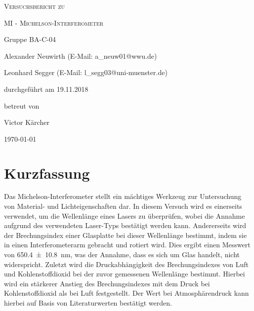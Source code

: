\documentclass[
	a4paper,
	12pt,
	pagesize,
	ngerman
]{scrartcl}
\begin{document}
	\begin{titlepage}
		\centering
		{\scshape\LARGE Versuchsbericht zu \par}
		\vspace{1cm}
		{\scshape\huge MI - Michelson-Interferometer \par} %
		\vspace{2.5cm}
		{\LARGE Gruppe BA-C-04 \par}
		\vspace{0.5cm}

		{\large Alexander Neuwirth (E-Mail: a\_neuw01@wwu.de) \par}
		{\large Leonhard Segger (E-Mail: l\_segg03@uni-muenster.de) \par}
		\vfill

		durchgeführt am 19.11.2018\par
		betreut von\par
		{\large Victor Kärcher} %

		\vfill

		{\large \today\par}
	\end{titlepage}
	\tableofcontents
	\newpage


	\section{Kurzfassung}
	Das Michelson-Interferometer stellt ein mächtiges Werkzeug zur Untersuchung von Material- und Lichteigenschaften dar.
	In diesem Versuch wird es einerseits verwendet, um die Wellenlänge eines Lasers zu überprüfen, wobei die Annahme aufgrund des verwendeten Laser-Typs bestätigt werden kann.
	Andererseits wird der Brechungsindex einer Glasplatte bei dieser Wellenlänge bestimmt, indem sie in einen Interferometerarm gebracht und rotiert wird.
	Dies ergibt einen Messwert von \SI{650,4+-10,8}{nm}, was der Annahme, dass es sich um Glas handelt, nicht widerspricht. %
	Zuletzt wird die Druckabhängigkeit des Brechungsindexes von Luft und Kohlenstoffdioxid bei der zuvor gemessenen Wellenlänge bestimmt.
	Hierbei wird ein stärkerer Anstieg des Brechungsindexes mit dem Druck bei Kohlenstoffdioxid als bei Luft festgestellt.
	Der Wert bei Atmosphärendruck kann hierbei auf Basis von Literaturwerten bestätigt werden.
\end{document}
